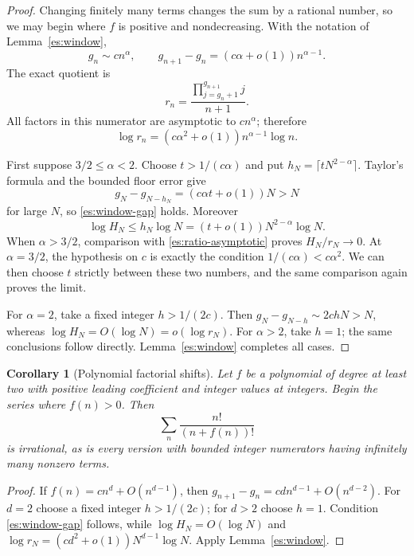 \documentclass[11pt,a4paper]{article}
\numberwithin{equation}{section}
\newtheorem{corollary}[theorem]{Corollary}
\theoremstyle{definition}
\theoremstyle{remark}
\begin{document}
\begin{proof}
Changing finitely many terms changes the sum by a rational number,
so we may begin where $f$ is positive and nondecreasing.  With the
notation of Lemma~\ref{es:window},
\[
 g_n\sim c n^\alpha,
 \qquad
 g_{n+1}-g_n=(c\alpha+o(1))n^{\alpha-1}.
\]
The exact quotient is
\[
 r_n=\frac{\prod_{j=g_n+1}^{g_{n+1}}j}{n+1}.
\]
All factors in this numerator are asymptotic to $c n^\alpha$;
therefore
\begin{equation}\label{es:ratio-asymptotic}
 \log r_n=(c\alpha^2+o(1))n^{\alpha-1}\log n.
\end{equation}

First suppose $3/2\le\alpha<2$.  Choose
$t>1/(c\alpha)$ and put $h_N=\lceil tN^{2-\alpha}\rceil$.
Taylor's formula and the bounded floor error give
\[
 g_N-g_{N-h_N}=(c\alpha t+o(1))N>N
\]
for large $N$, so \eqref{es:window-gap} holds.  Moreover
\begin{equation}\label{es:height-upper}
 \log H_N\le h_N\log N
       =(t+o(1))N^{2-\alpha}\log N.
\end{equation}
When $\alpha>3/2$, comparison with
\eqref{es:ratio-asymptotic} proves $H_N/r_N\to0$.
At $\alpha=3/2$, the hypothesis on $c$ is exactly the condition
$1/(c\alpha)<c\alpha^2$.  We can then choose $t$ strictly between
these two numbers, and the same comparison again proves the limit.

For $\alpha=2$, take a fixed integer $h>1/(2c)$.
Then $g_N-g_{N-h}\sim2chN>N$, whereas
$\log H_N=O(\log N)=o(\log r_N)$.
For $\alpha>2$, take $h=1$; the same conclusions follow directly.
Lemma~\ref{es:window} completes all cases.
\end{proof}

\begin{corollary}[Polynomial factorial shifts]
\label{es:polynomial270}
Let $f$ be a polynomial of degree at least two with positive leading
coefficient and integer values at integers.  Begin the series where
$f(n)>0$.  Then
\[
 \sum_n\frac{n!}{(n+f(n))!}
\]
is irrational, as is every version with bounded integer numerators
having infinitely many nonzero terms.
\end{corollary}

\begin{proof}
If $f(n)=cn^d+O(n^{d-1})$, then
$g_{n+1}-g_n=cd n^{d-1}+O(n^{d-2})$.
For $d=2$ choose a fixed integer $h>1/(2c)$; for $d>2$ choose
$h=1$.  Condition \eqref{es:window-gap} follows, while
$\log H_N=O(\log N)$ and
$\log r_N=(cd^2+o(1))N^{d-1}\log N$.
Apply Lemma~\ref{es:window}.
\end{proof}
\end{document}
